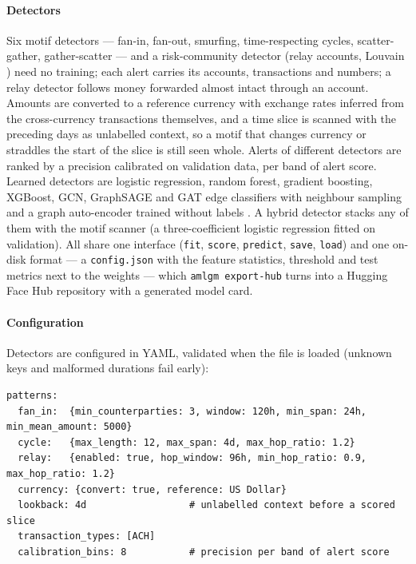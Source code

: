 \documentclass[review,12pt]{elsarticle}%
\begin{document}
\paragraph{Detectors} Six motif detectors --- fan-in, fan-out, smurfing, time-respecting cycles,
scatter-gather, gather-scatter --- and a risk-community detector (relay accounts, Louvain
\cite{blondel2008fast}) need no training; each alert carries its accounts, transactions and
numbers; a relay detector follows money forwarded almost intact through an account. Amounts are
converted to a reference currency with exchange rates inferred from the cross-currency
transactions themselves, and a time slice is scanned with the preceding days as unlabelled
context, so a motif that changes currency or straddles the start of the slice is still seen whole.
Alerts of different detectors are ranked by a precision calibrated on validation data, per band of
alert score. Learned detectors are logistic regression, random forest, gradient boosting, XGBoost,
GCN, GraphSAGE and GAT edge classifiers with neighbour sampling and a graph auto-encoder trained
without labels \cite{kipf2016variational,ding2019deep}. A hybrid detector stacks any of them with
the motif scanner (a three-coefficient logistic regression fitted on validation). All share one
interface (\texttt{fit}, \texttt{score}, \texttt{predict}, \texttt{save}, \texttt{load}) and one
on-disk format --- a \texttt{config.json} with the feature statistics, threshold and test metrics
next to the weights --- which \texttt{amlgm export-hub} turns into a Hugging Face Hub repository with
a generated model card.

\paragraph{Configuration} Detectors are configured in YAML, validated when the file is loaded
(unknown keys and malformed durations fail early):

\begin{lstlisting}
patterns:
  fan_in:  {min_counterparties: 3, window: 120h, min_span: 24h, min_mean_amount: 5000}
  cycle:   {max_length: 12, max_span: 4d, max_hop_ratio: 1.2}
  relay:   {enabled: true, hop_window: 96h, min_hop_ratio: 0.9, max_hop_ratio: 1.2}
  currency: {convert: true, reference: US Dollar}
  lookback: 4d                  # unlabelled context before a scored slice
  transaction_types: [ACH]
  calibration_bins: 8           # precision per band of alert score
\end{lstlisting}
\end{document}
